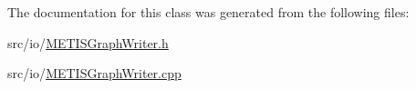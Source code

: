The documentation for this class was generated from the following files\-:\begin{DoxyCompactItemize}
\item 
src/io/\hyperlink{_m_e_t_i_s_graph_writer_8h}{M\-E\-T\-I\-S\-Graph\-Writer.\-h}\item 
src/io/\hyperlink{_m_e_t_i_s_graph_writer_8cpp}{M\-E\-T\-I\-S\-Graph\-Writer.\-cpp}\end{DoxyCompactItemize}
